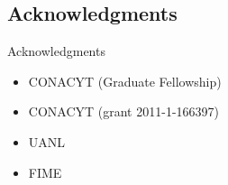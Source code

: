 
\subsection{Acknowledgments}
\begin{frame}{Acknowledgments}
\begin{itemize}
\item CONACYT (Graduate Fellowship)
\item CONACYT (grant 2011-1-166397)
\item UANL
\item FIME
\end{itemize}

\end{frame}
